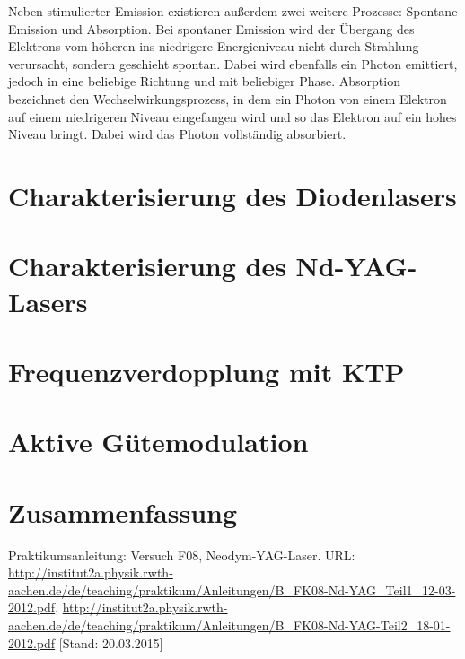 \documentclass{../Misc/MontavonLaTeX/Montavon}
\begin{document}
Neben stimulierter Emission existieren außerdem zwei weitere Prozesse: Spontane Emission und Absorption. Bei spontaner Emission wird der Übergang des Elektrons vom höheren ins niedrigere Energieniveau nicht durch Strahlung verursacht, sondern geschieht spontan. Dabei wird ebenfalls ein Photon emittiert, jedoch in eine beliebige Richtung und mit beliebiger Phase. Absorption bezeichnet den Wechselwirkungsprozess, in dem ein Photon von einem Elektron auf einem niedrigeren Niveau eingefangen wird und so das Elektron auf ein hohes Niveau bringt. Dabei wird das Photon vollständig absorbiert.

\section{Charakterisierung des Diodenlasers}

\section{Charakterisierung des Nd-YAG-Lasers}

\section{Frequenzverdopplung mit KTP}

\section{Aktive Gütemodulation}

\section{Zusammenfassung}

\newpage
\begin{thebibliography}{xxxx}
 Praktikumsanleitung:
Versuch F08, Neodym-YAG-Laser. URL: \url{http://institut2a.physik.rwth-aachen.de/de/teaching/praktikum/Anleitungen/B_FK08-Nd-YAG_Teil1_12-03-2012.pdf}, \url{http://institut2a.physik.rwth-aachen.de/de/teaching/praktikum/Anleitungen/B_FK08-Nd-YAG-Teil2_18-01-2012.pdf} [Stand: 20.03.2015]
\end{thebibliography}
\end{document}
